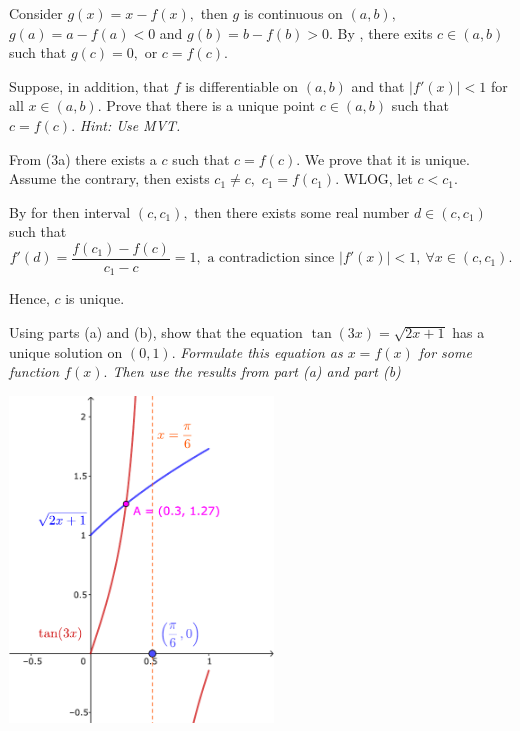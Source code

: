 \documentclass{article}
\begin{document}
\begin{soln}
    Consider $g(x) = x - f(x),$ then $g$ is continuous on $(a,b),$ $g(a) = a - f(a) < 0$ and $g(b) = b - f(b) > 0.$
    By , there exits $c \in (a,b)$ such that $g(c) = 0,$ or $\boxed{c = f(c).}$
\end{soln}

\bigbreak

\begin{problem*}[3b]
    Suppose, in addition, that $f$ is differentiable on $(a,b)$ and that $|f'(x)| < 1$ for all $x \in (a,b).$
    Prove that there is a unique point $c \in (a, b)$ such that $c = f(c).$
    \textit{Hint: Use MVT.}
\end{problem*}

\begin{soln}
    From (3a) there exists a $c$ such that $c = f(c).$ We prove that it is unique.
    Assume the contrary, then exists $c_1 \ne c,$ $c_1 = f(c_1).$ WLOG, let $c < c_1.$

    By  for then interval $(c, c_1),$ then there exists some real number $d \in (c,c_1)$ such that 
    \[
        f'(d) = \frac{f(c_1) - f(c)}{c_1 - c} = 1, \text{\ a contradiction since\ } |f'(x)| < 1,\ \forall x \in (c, c_1).
    \]
    
    Hence, $c$ is unique.
\end{soln}

\newpage

\begin{problem*}[3c]
    Using parts (a) and (b), show that the equation $\tan(3x) = \sqrt{2x + 1}$ has a unique solution on $(0, 1).$
    \textit{Formulate this equation as $x = f(x)$ for some function $f(x).$ Then use the results from part (a) and part (b)}
\end{problem*}

\begin{center}
    \includegraphics[width=7cm]{./svg/pdf/derivative-2-3c.pdf}
\end{center}
\end{document}
